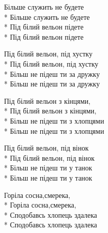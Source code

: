 \medskip

\begin{minipage}{\linewidth}
Більше служить не будете\\*
Більше служить не будете\\*
Під білий вельон підете\\*
Під білий вельон підете\\
\end{minipage}\par\medskip\nobreak

\medskip

\begin{minipage}{\linewidth}
Під білий вельон, під хустку\\*
Під білий вельон, під хустку\\*
Більш не підеш ти за дружку\\*
Більш не підеш ти за дружку\\
\end{minipage}\par\medskip\nobreak

\medskip

\begin{minipage}{\linewidth}
Під білий вельон з кінцями,\\*
Під білий вельон з кінцями,\\*
Більш не підеш ти з хлопцями\\*
Більш не підеш ти з хлопцями\\
\end{minipage}\par\medskip\nobreak

\medskip

\begin{minipage}{\linewidth}
Під білий вельон, під вінок\\*
Під білий вельон, під вінок\\*
Більш не підеш ти у танок\\*
Більш не підеш ти у танок\\
\end{minipage}\par\medskip\nobreak

\medskip

\begin{minipage}{\linewidth}
Горіла сосна,смерека,\\*
Горіла сосна,смерека,\\*
Сподобавсь хлопець здалека\\*
Сподобавсь хлопець здалека\\
\end{minipage}


